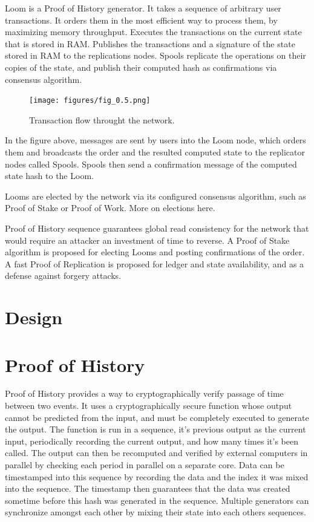 \documentclass[12pt]{article}
\begin{document}
Loom is a Proof of History generator.  It takes a sequence of arbitrary user transactions.  It orders them in the most efficient way to process them, by maximizing memory throughput.  Executes the transactions on the current state that is stored in RAM.  Publishes the transactions and a signature of the state stored in RAM to the replications nodes.  Spools replicate the operations on their copies of the state, and publish their computed hash as confirmations via consensus algorithm.

\begin{figure}
  \begin{center}
    \centering
    \texttt{[image: figures/fig\_0.5.png]}
    \caption[Fig 1]{Transaction flow throught the network.\label{fig_1}}
  \end{center}
  \end{figure}

In the figure above, messages are sent by users into the Loom node, which orders them and broadcasts the order and the resulted computed state to the replicator nodes called Spools.  Spools then send a confirmation message of the computed state hash to the Loom.

Looms are elected by the network via its configured consensus algorithm, such as Proof of Stake or Proof of Work.  More on elections here.

Proof of History sequence guarantees global read consistency for the network that would require an attacker an investment of time to reverse.  A Proof of Stake algorithm is proposed for electing Looms and posting confirmations of the order.  A fast Proof of Replication is proposed for ledger and state availability, and as a defense against forgery attacks.
\section{Design}

\section{Proof of History}\label{proof_of_history}

Proof of History provides a way to cryptographically verify passage of time between two events. It uses a cryptographically secure function whose output cannot be predicted from the input, and must be completely executed to generate the output. The function is run in a sequence, it’s previous output as the current input, periodically recording the current output, and how many times it’s been called. The output can then be recomputed and verified by external computers in parallel by checking each period in parallel on a separate core. Data can be timestamped into this sequence by recording the data and the index it was mixed into the sequence. The timestamp then guarantees that the data was created sometime before this hash was generated in the sequence. Multiple generators can synchronize amongst each other by mixing their state into each others sequences. \\
\end{document}
